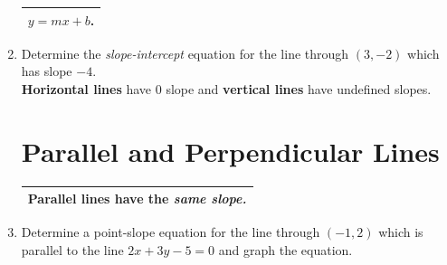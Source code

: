 \documentclass[11pt]{article}
\begin{document}
\begin{enumerate}
\begin{tabular}{| l |}
 $y = mx +b$. \\ \hline
\end{tabular} 



\vspace{-.1in}
\item Determine the \emph{slope-intercept} equation for the line through $(3, -2)$ which has slope $-4$. \\[1in]



\noindent \textbf{Horizontal lines} have 0 slope and \textbf{vertical lines} have undefined slopes.\\[1in]


\section{Parallel and Perpendicular Lines}
\hspace{-.3in} \begin{tabular}{| l |  }
\hline Parallel lines have the \emph{same slope.} \\ \hline
\end{tabular} %

\vspace{-.1in}
\item Determine a point-slope equation for the line through $(-1,2)$ which is parallel to the line $2x + 3y - 5 = 0$ and graph the equation.\\
\\[1in]






\end{enumerate}
\end{document}
